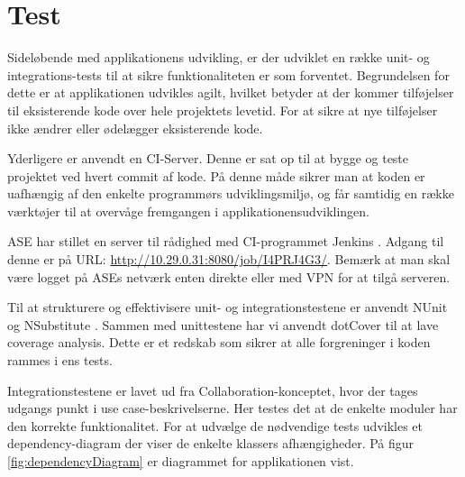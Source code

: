\chapter{Test}
Sideløbende med applikationens udvikling, er der udviklet en række unit- og integrations-tests til at sikre funktionaliteten er som forventet. Begrundelsen for dette er at applikationen udvikles agilt, hvilket betyder at der kommer tilføjelser til eksisterende kode over hele projektets levetid. For at sikre at nye tilføjelser ikke ændrer eller ødelægger eksisterende kode.

Yderligere er anvendt en CI-Server. Denne er sat op til at bygge og teste projektet ved hvert commit af kode. På denne måde sikrer man at koden er uafhængig af den enkelte programmørs udviklingsmiljø, og får samtidig en række værktøjer til at overvåge fremgangen i applikationensudviklingen.

ASE har stillet en server til rådighed med CI-programmet Jenkins \citep{jenkinsWeb}. Adgang til denne er på URL: \url{http://10.29.0.31:8080/job/I4PRJ4G3/}. Bemærk at man skal være logget på ASEs netværk enten direkte eller med VPN for at tilgå serveren.

Til at strukturere og effektivisere unit- og integrationstestene er anvendt NUnit \citep{nunitWeb} og NSubstitute \citep{nsubstituteWeb}. Sammen med unittestene har vi anvendt dotCover \citep{dotCoverWeb} til at lave coverage analysis. Dette er et redskab som sikrer at alle forgreninger i koden rammes i ens tests.

Integrationstestene er lavet ud fra Collaboration-konceptet, hvor der tages udgangs punkt i use case-beskrivelserne. Her testes det at de enkelte moduler har den korrekte funktionalitet.
For at udvælge de nødvendige tests udvikles et dependency-diagram der viser de enkelte klassers afhængigheder. På figur \ref{fig:dependencyDiagram} er diagrammet for applikationen vist.

